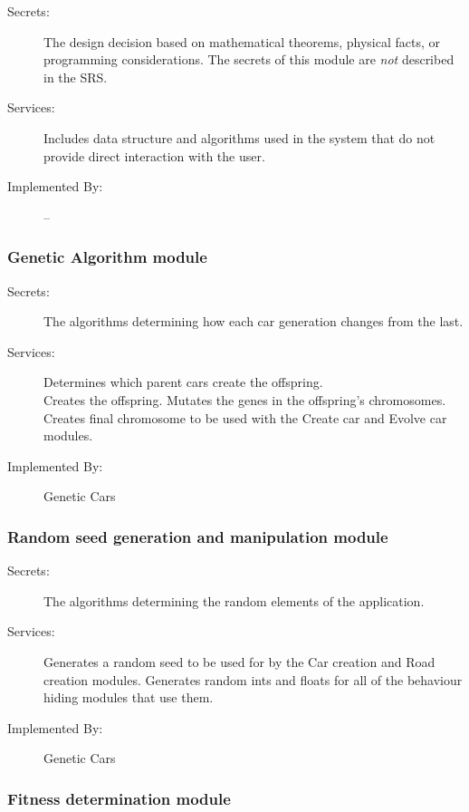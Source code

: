 \documentclass[12pt, titlepage]{article}
\begin{document}
\begin{description}
\item[Secrets:] The design decision based on mathematical theorems, physical
  facts, or programming considerations. The secrets of this module are
  \emph{not} described in the SRS.
\item[Services:] Includes data structure and algorithms used in the system that
  do not provide direct interaction with the user. 
\item[Implemented By:] --
\end{description}

\subsubsection{Genetic Algorithm module}

\begin{description}
\item[Secrets:] The algorithms determining how each car generation changes from 
the last.
\item[Services:] Determines which parent cars create the offspring. \\ Creates 
the 
offspring. Mutates the genes in the offspring's chromosomes. Creates final 
chromosome to be used with the Create car and Evolve car modules.
\item[Implemented By:] Genetic Cars
\end{description}

\subsubsection{Random seed generation and manipulation module}

\begin{description}
\item[Secrets:] The algorithms determining the random elements of the 
application.
\item[Services:] Generates a random seed to be used for by the Car creation and 
Road creation modules. Generates random ints and floats for all of the behaviour 
hiding modules that use them.
\item[Implemented By:] Genetic Cars
\end{description}

\subsubsection{Fitness determination module}
\end{document}
